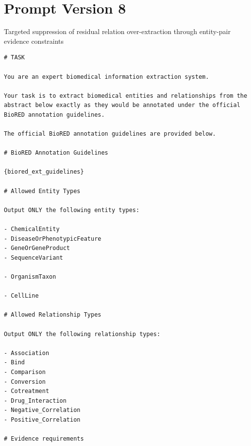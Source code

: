 \section{Prompt Version 8}
Targeted suppression of residual relation over-extraction through entity-pair evidence constraints
\begin{lstlisting}
# TASK

You are an expert biomedical information extraction system.

Your task is to extract biomedical entities and relationships from the abstract below exactly as they would be annotated under the official BioRED annotation guidelines.

The official BioRED annotation guidelines are provided below.

# BioRED Annotation Guidelines

{biored_ext_guidelines}

# Allowed Entity Types

Output ONLY the following entity types:

- ChemicalEntity
- DiseaseOrPhenotypicFeature
- GeneOrGeneProduct
- SequenceVariant

- OrganismTaxon

- CellLine

# Allowed Relationship Types

Output ONLY the following relationship types:

- Association
- Bind
- Comparison
- Conversion
- Cotreatment
- Drug_Interaction
- Negative_Correlation
- Positive_Correlation

# Evidence requirements


\end{lstlisting}
